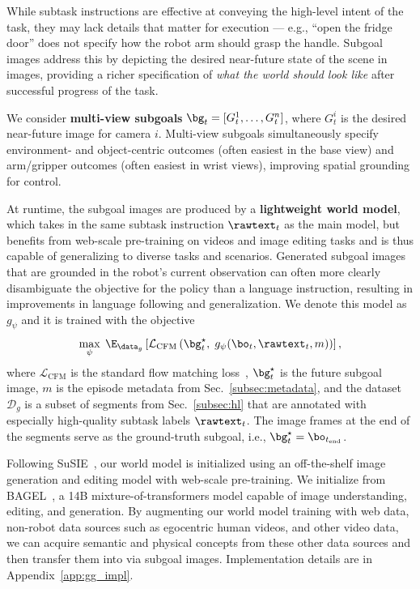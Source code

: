 

While subtask instructions are effective at conveying the high-level intent of the task, they may lack details that matter for execution --- e.g., ``open the fridge door'' does not specify how the robot arm should grasp the handle. Subgoal images address this by depicting the desired near-future state of the scene in images, providing a richer specification of \emph{what the world should look like} after successful progress of the task.

We consider \textbf{multi-view subgoals} $\bg_t = [G_t^1,\ldots,G_t^n]$, where $G_t^i$ is the desired near-future image for camera $i$. Multi-view subgoals simultaneously specify environment- and object-centric outcomes (often easiest in the base view) and arm/gripper outcomes (often easiest in wrist views), improving spatial grounding for control.

At runtime, the subgoal images are produced by a \textbf{lightweight world model}, which takes in the same subtask instruction $\rawtext_t$ as the main model, but benefits from web-scale pre-training on videos and image editing tasks and is thus capable of generalizing to diverse tasks and scenarios. Generated subgoal images that are grounded in the robot's current observation can often more clearly disambiguate the objective for the policy than a language instruction, resulting in improvements in language following and generalization.
We denote this model as $g_\psi$ and it is trained with the objective
\begin{equation*}
\max_{\psi}\;
\E_{\data_g} %
\left[
\mathcal{L}_\text{CFM}
\left(
\bg_t^{\star},\; g_\psi(\bo_t,\rawtext_t,m)
\right)
\right],
\end{equation*}
where $\mathcal{L}_\text{CFM}$ is the standard flow matching loss~\citep{lipman2022flow}, $\bg^{\star}_t$ is the future subgoal image, $m$ is the episode metadata from Sec.~\ref{subsec:metadata}, and the dataset $\mathcal{D}_g$ is a subset of segments from Sec.~\ref{subsec:hl} that are annotated with especially high-quality subtask labels $\rawtext_t$.
The image frames at the end of the segments serve as the ground-truth subgoal, i.e., $\bg_t^{\star} = \bo_{t_{\mathrm{end}}}$. 

Following SuSIE~\citep{black2023zero}, our world model is initialized using an off-the-shelf image generation and editing model with web-scale pre-training. We initialize from BAGEL~\cite{deng2025emerging}, a 14B mixture-of-transformers model capable of image understanding, editing, and generation.
By augmenting our world model training with web data, non-robot data sources such as egocentric human videos, and other video data, we can acquire semantic and physical concepts from these other data sources and then transfer them into \MethodName{} via subgoal images. Implementation details are in Appendix~\ref{app:gg_impl}.


